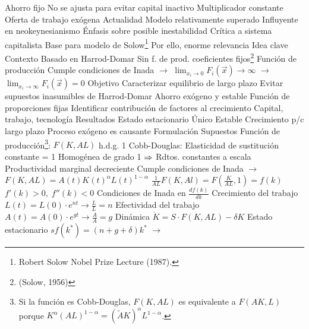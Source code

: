 \documentclass{nuevotema}
\begin{document}
\begin{esquemal}
				\4 Ahorro fijo
				\4[] No se ajusta para evitar capital inactivo
				\4 Multiplicador constante
				\4 Oferta de trabajo exógena
			\3 Actualidad
				\4 Modelo relativamente superado
				\4 Influyente en neokeynesianismo
				\4[] Énfasis sobre posible inestabilidad
				\4 Crítica a sistema capitalista
				\4 Base para modelo de Solow\footnote{Robert Solow Nobel Prize Lecture (1987).}
				\4[] Por ello, enorme relevancia
	\1 
		\2 Idea clave
			\3 Contexto
				\4 Basado en Harrod-Domar
				\4[] Sin f. de prod. coeficientes fijos\footnote{ (Solow, 1956)}
				\4 Función de producción
				\4[] Cumple condiciones de Inada
				\4[] $\to$ $\lim_{x_i \to 0} F_i(\vec{x}) \to \infty$
				\4[] $\to$ $\lim_{x_i \to \infty} F_i(\vec{x}) = 0$
			\3 Objetivo
				\4 Caracterizar equilibrio de largo plazo
				\4 Evitar supuestos inasumibles de Harrod-Domar
				\4[] Ahorro exógeno y estable
				\4[] Función de proporciones fijas
				\4 Identificar contribución de factores al crecimiento
				\4[] Capital, trabajo, tecnología
			\3 Resultados
				\4 Estado estacionario
				\4[] Único
				\4[] Estable
				\4 Crecimiento p/c largo plazo
				\4[] Proceso exógeno es causante
		\2 Formulación
			\3 Supuestos
				\4 Función de producción\footnote{Si la función es Cobb-Douglas, $F(K, AL)$ es equivalente a $F(AK, L)$ porque $K^\alpha (AL)^{1-\alpha} = (\tilde{A} K)^\alpha L^{1-\alpha}$.}: $F(K, AL)$  h.d.g. 1
				\4[] Cobb-Douglas:
				\4[] Elasticidad de sustitución constante = 1
				\4[] Homogénea de grado 1 $\Rightarrow$ Rdtos. constantes a escala
				\4[] Productividad marginal decreciente
				\4[] Cumple condiciones de Inada
				\4[] $\to$ $F(K,AL) = A(t) K(t)^\alpha L(t)^{1-\alpha}$
				\4[] $\frac{1}{AL}F(K, Al) = F(\frac{K}{AL},1) = f(k)$
				\4[] $f'(k) > 0, \; f''(k)<0$
				\4[] Condiciones de Inada en $\frac{df(k)}{dk}$
				\4 Crecimiento del trabajo
				\4[] $L(t) = L(0)\cdot e^{nt} \rightarrow \frac{\dot{L}}{L} = n$
				\4 Efectividad del trabajo
				\4[] $A(t) = A(0)\cdot e^{gt} \rightarrow \frac{\dot{A}}{A} = g$
			\3 Dinámica
				\4 $\dot{K} = S\cdot F(K, AL) - \delta K$
				\4 
				\4 Estado estacionario
				\4[] $sf(k^*) = (n+g+\delta)k^*$
				\4[] $\to$ 

\end{esquemal}
\end{document}

